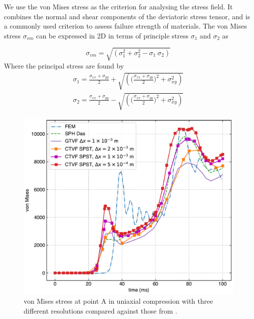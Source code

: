 \documentclass[preprint,12pt]{elsarticle}
\begin{document}
We use the von Mises stress as the criterion for analysing the stress field.
It combines the normal and shear components of the deviatoric stress tensor,
and is a commonly used criterion to assess failure strength of materials. The
von Mises stress $\sigma_{vm}$ can be expressed in 2D in terms of principle
stress $\sigma_1$ and $\sigma_2$ as

\begin{equation}
  \label{eq:von_mises_with_principal_stress}
  \sigma_{vm} = \sqrt{\left(\sigma_1^2 + \sigma_2^2 - \sigma_1 \ \sigma_2\right)}
\end{equation}
%
%
Where the principal stress are found by
\begin{eqnarray}
  \label{eq:principal_stress}
  \sigma_{1} = \frac{\sigma_{xx} + \sigma_{yy}}{2} + \sqrt{\left(\bigg(
  \frac{\sigma_{xx} + \sigma_{yy}}{2}\bigg)^2 + \sigma_{xy}^2\right)}\\
  \sigma_{2} = \frac{\sigma_{xx} + \sigma_{yy}}{2} -  \sqrt{\left(\bigg(
  \frac{\sigma_{xx} + \sigma_{yy}}{2}\bigg)^2 + \sigma_{xy}^2\right)}
\end{eqnarray}
%
\begin{figure}[!htpb]
  \centering
  \includegraphics[width=1\linewidth]{fig_24}
  \caption{von Mises stress at point A in uniaxial compression with three
    different resolutions compared against those from
    \cite{das2015evaluation}.}
\label{fig:uniaxial}
\end{figure}
\end{document}
